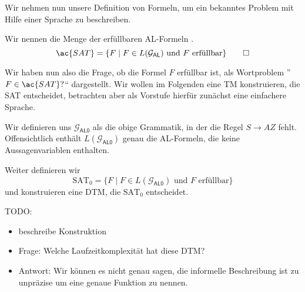 Wir nehmen nun unsere Definition von Formeln, um ein bekanntes Problem mit Hilfe einer Sprache zu beschreiben.
\begin{Def}
Wir nennen die Menge der erfüllbaren \ac{AL}-Formeln .
\[ \ac{SAT}=\{F\mid F\in L(\mathcal{G}_\mathsf{AL}) \text{ und $F$ erfüllbar}\}\qedhere \]
\end{Def}


Wir haben nun also die Frage, ob die Formel $F$ erfüllbar ist, als Wortproblem ''$F\in \ac{SAT}?$`` dargestellt.
Wir wollen im Folgenden eine \ac{TM} konstruieren, die \ac{SAT} entscheidet, betrachten aber als Vorstufe hierfür zunächst eine einfachere Sprache.


Wir definieren uns $\mathcal{G}_\mathsf{AL0}$ als die obige Grammatik, in der die Regel $S\to AZ$ fehlt.
Offensichtlich enthält $L(\mathcal{G}_\mathsf{AL0})$ genau die \ac{AL}-Formeln, die keine Aussagenvariablen enthalten.

Weiter definieren wir 
$$\text{SAT}_0=\{F\mid F\in L(\mathcal{G}_\mathsf{AL0}) \text{ und $F$ erfüllbar}\}$$
und konstruieren eine \ac{DTM}, die $\text{SAT}_0$ entscheidet.

{\color{red}
TODO: 

\begin{itemize}
 \item beschreibe Konstruktion
 \item Frage: Welche Laufzeitkomplexität hat diese \ac{DTM}?
 \item Antwort: Wir können es nicht genau sagen, die informelle Beschreibung ist zu unpräzise um eine genaue Funktion zu nennen.
\end{itemize}

}

